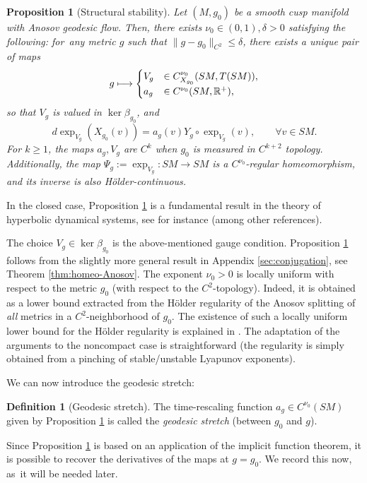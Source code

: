 \documentclass[10pt]{amsart}
\newcommand\mto{\mathchoice{\longmapsto}{\mapsto}{\mapsto}{\mapsto}}
\newcommand{\R}{\mathbb{R}}
\theoremstyle{plain}
\newtheorem{proposition}{Proposition}[section]
\theoremstyle{definition}
\newtheorem{definition}{Definition}[section]
\begin{document}
\begin{proposition}[Structural stability]
\label{prop:conjugation}
Let $(M,g_0)$ be a smooth cusp manifold with Anosov geodesic flow. Then, there exists $\nu_0 \in (0,1), \delta>0$ satisfying the following: for~any metric $g$ such that $\|g-g_0\|_{C^2}\leq \delta$, there exists a unique pair of maps
\[
g \mto \begin{cases} V_g &\in C_{X_{g_0}}^{\nu_0}(SM, T( SM)), \\ a_{g} &\in C^{\nu_0}(SM, \R^+),\end{cases}
\]
so that $V_g$ is valued in $\ker \beta_{g_0}$, and
\[
d \exp_{V_g}(X_{g_0}(v)) = a_g (v)Y_g \circ \exp_{V_g}(v), \qquad \forall v \in SM.
\]
For $k \geq 1$, the maps $a_g,V_g$ are $C^k$ when $g_0$ is measured in $C^{k+2}$ topology. Additionally, the map $\Psi_{g} := \exp_{V_g} : SM \to SM$ is a $C^{\nu_0}$-regular homeomorphism, and its inverse is also H\"older-continuous.
\end{proposition}

{\color{black}In the closed case, Proposition \ref{prop:conjugation} is a fundamental result in the theory of hyperbolic dynamical systems, see \cite{Katok-Knieper-Pollicott-Weiss-89,Contreras-92} for instance (among other references).}

The choice $V_g \in \ker \beta_{g_0}$ is the above-mentioned gauge condition. Proposition \ref{prop:conjugation} follows from the slightly more general result in Appendix \ref{sec:conjugation}, see Theorem \ref{thm:homeo-Anosov}. The exponent $\nu_0 > 0$ is locally uniform with respect to the metric $g_0$ (with respect to the $C^2$-topology). Indeed, it is obtained as a lower bound extracted from the Hölder regularity of the Anosov splitting of \emph{all} metrics in a $C^2$-neighborhood of $g_0$. The existence of such a locally uniform lower bound for the Hölder regularity is explained in \cite[Lem.\,5.4]{Bonthonneau-Lefeuvre-21}. The adaptation of the arguments to the noncompact case is straightforward (the regularity is simply obtained from a pinching of stable/unstable Lyapunov exponents).

We can now introduce the geodesic stretch:

\begin{definition}[Geodesic stretch]
The time-rescaling function $a_{g} \in C^{\nu_0}(SM)$ given by Proposition \ref{prop:conjugation} is called the \emph{geodesic stretch} (between $g_0$ and $g$).
\end{definition}

Since Proposition \ref{prop:conjugation} is based on an application of the implicit function theorem, it is possible to recover the derivatives of the maps at $g=g_0$. We record this now, as~it will be needed later.
\end{document}
